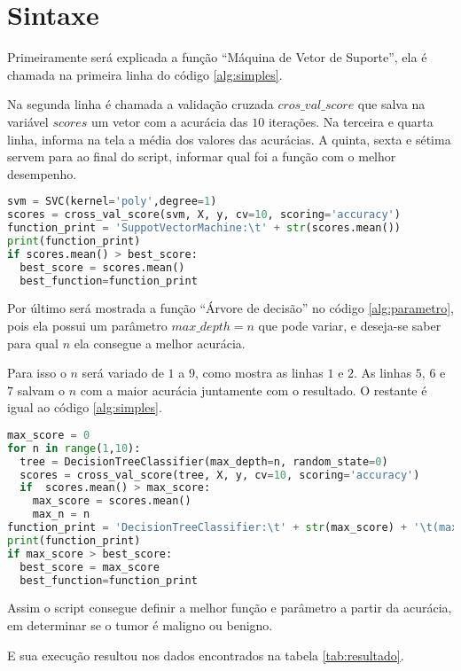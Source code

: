 \section{Sintaxe}
\label{sintaxe}
Primeiramente será explicada a função ``Máquina de Vetor de Suporte'',
ela é chamada na primeira linha do código \ref{alg:simples}.

Na segunda linha é chamada a validação cruzada $cros\_val\_score$ que salva na variável $scores$ um vetor com a acurácia das $10$ iterações.
Na terceira e quarta linha, informa na tela a média dos valores das acurácias.
A quinta, sexta e sétima servem para ao final do script, informar qual foi a função com o melhor desempenho.

\begin{lstlisting}[language=Python, caption=Sintaxe Simples, label=alg:simples]
svm = SVC(kernel='poly',degree=1)
scores = cross_val_score(svm, X, y, cv=10, scoring='accuracy')
function_print = 'SuppotVectorMachine:\t' + str(scores.mean())
print(function_print)
if scores.mean() > best_score:
  best_score = scores.mean()
  best_function=function_print
\end{lstlisting}

Por último será mostrada a função ``Árvore de decisão'' no código \ref{alg:parametro},
pois ela possui um parâmetro $max\_depth=n$ que pode variar,
e deseja-se saber para qual $n$ ela consegue a melhor acurácia.

Para isso o $n$ será variado de $1$ a $9$, como mostra as linhas $1$ e $2$.
As linhas $5$, $6$ e $7$ salvam o $n$ com a maior acurácia juntamente com o resultado.
O restante é igual ao código \ref{alg:simples}.

\begin{lstlisting}[language=Python, caption=Sintaxe com Parâmetro, label=alg:parametro]
max_score = 0
for n in range(1,10):
  tree = DecisionTreeClassifier(max_depth=n, random_state=0)
  scores = cross_val_score(tree, X, y, cv=10, scoring='accuracy')
  if  scores.mean() > max_score:
    max_score = scores.mean()
    max_n = n
function_print = 'DecisionTreeClassifier:\t' + str(max_score) + '\t(max_depth=' + str(max_n) + ')'
print(function_print)
if max_score > best_score:
  best_score = max_score
  best_function=function_print
\end{lstlisting}

Assim o script consegue definir a melhor função e parâmetro a partir da acurácia, em determinar se o tumor é maligno ou benigno.


E sua execução resultou nos dados encontrados na tabela \ref{tab:resultado}.

